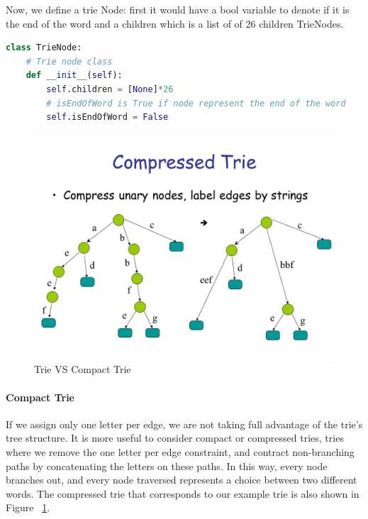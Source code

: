 \documentclass[../main.tex]{subfiles}
\begin{document}
Now, we define a trie Node: first it would have a bool variable to denote if it is the end of the word and a children which is a list of of 26 children TrieNodes. 
\begin{lstlisting}[language= Python]
class TrieNode:
    # Trie node class
    def __init__(self):
        self.children = [None]*26
        # isEndOfWord is True if node represent the end of the word
        self.isEndOfWord = False
\end{lstlisting}
\begin{figure}[h]
    \centering
    \includegraphics[width=0.6\columnwidth]{fig/trie_compact_trie.jpg}
    \caption{Trie VS Compact Trie}
    \label{fig:trie_compact_trie}
\end{figure}

\paragraph{Compact Trie} If we assign only one letter per edge, we are not taking full advantage of the trie’s tree structure. It is more useful to consider compact or compressed tries, tries where we remove the one letter per edge constraint, and contract non-branching paths by concatenating the letters on these paths.
In this way, every node branches out, and every node traversed represents a choice between two different words.  The compressed trie that corresponds to our example trie is also shown in Figure
~\ref{fig:trie_compact_trie}. 
\end{document}
